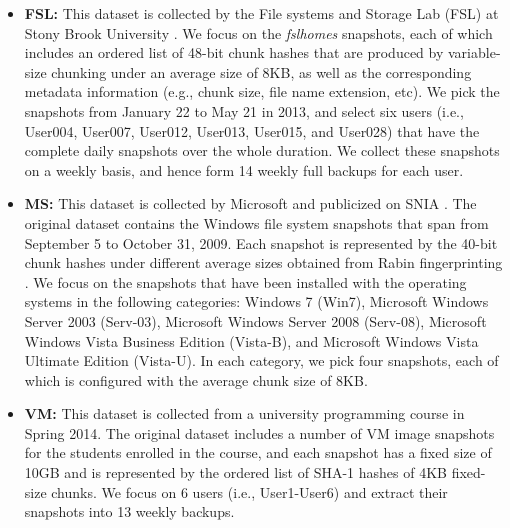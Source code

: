 %

\begin{itemize}[leftmargin=*]
\item 
\textbf{FSL:} This dataset is collected by the File systems and
        Storage Lab (FSL) at Stony Brook University \cite{sun16,FSL14,sun18}. We focus on
the {\em fslhomes} snapshots, each of which includes an ordered list of 48-bit
chunk hashes that are produced by variable-size chunking under an average size
of 8KB, as well as the corresponding metadata information (e.g., chunk size,
file name extension, etc). We pick the snapshots from January 22 to May 21 in
2013, and select six users (i.e., User004, User007, User012, User013, User015,
and User028) that have the complete daily snapshots over the whole duration.
We collect these snapshots on a weekly basis, and hence form 14 weekly full
backups for each user.  
\item 
\textbf{MS:} This dataset is collected by Microsoft
\cite{meyer11} and publicized on SNIA \cite{ms}. The original dataset contains
the Windows file system snapshots that span from September 5 to October 31,
2009. Each snapshot is represented by the 40-bit chunk hashes under different
average sizes obtained from Rabin fingerprinting \cite{rabin81}.  We focus on
the snapshots that have been installed with the operating systems in the
following categories: Windows 7 (Win7), Microsoft Windows Server 2003
(Serv-03), Microsoft Windows Server 2008 (Serv-08), Microsoft Windows Vista
Business Edition (Vista-B), and Microsoft Windows Vista Ultimate Edition
(Vista-U). In each category, we pick four snapshots, each of which is
configured with the average chunk size of 8KB.   
\item 
\textbf{VM:} This dataset is collected from a university programming course in
Spring 2014. The original dataset includes a number of VM image snapshots for
the students enrolled in the course, and each snapshot has a fixed size of
10GB and is represented by the ordered list of SHA-1 hashes of 4KB fixed-size
chunks. We focus on 6 users (i.e., User1-User6) and extract their snapshots
into 13 weekly backups.  
\end{itemize}


